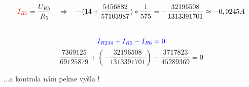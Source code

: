 $${\color{red}{I_{R5}}}=\frac{U_{R5}}{R_5} \quad \Rightarrow \quad -(14+ \frac{5456882}{57103987})*\frac{1}{575} = -\frac{32196508}{1313391701} \approx -0,0245A  $$
\\
$${\color{blue}{I_{R234}+I_{R5}-I_{R6}=0}}$$
$$\frac{7369125}{69125879} + (-\frac{32196508}{1313391701}) - \frac{3717823}{45289369} = 0 $$

\vspace{1cm}
...a kontrola nám pekne vyšla !